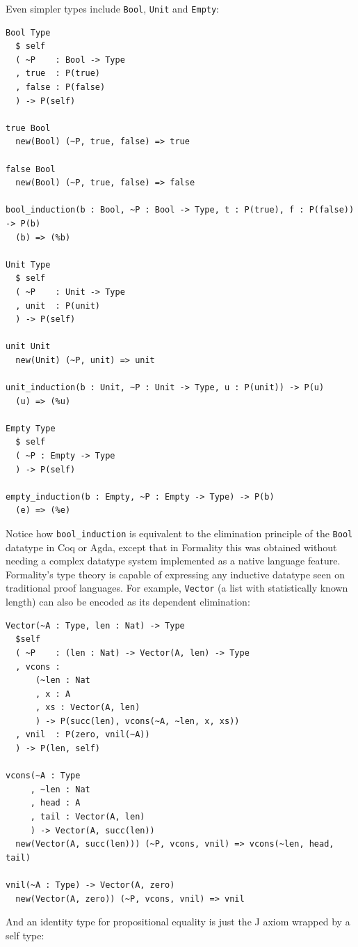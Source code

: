 \documentclass{article}
\theoremstyle{definition}
\theoremstyle{theorem}
\begin{document}
Even simpler types include \verb|Bool|, \verb|Unit| and \verb|Empty|:

\begin{lstlisting}
Bool Type
  $ self
  ( ~P    : Bool -> Type
  , true  : P(true)
  , false : P(false)
  ) -> P(self)

true Bool
  new(Bool) (~P, true, false) => true

false Bool
  new(Bool) (~P, true, false) => false

bool_induction(b : Bool, ~P : Bool -> Type, t : P(true), f : P(false)) -> P(b)
  (b) => (%b)

Unit Type
  $ self
  ( ~P    : Unit -> Type
  , unit  : P(unit)
  ) -> P(self)

unit Unit
  new(Unit) (~P, unit) => unit

unit_induction(b : Unit, ~P : Unit -> Type, u : P(unit)) -> P(u)
  (u) => (%u)

Empty Type
  $ self
  ( ~P : Empty -> Type
  ) -> P(self)

empty_induction(b : Empty, ~P : Empty -> Type) -> P(b)
  (e) => (%e)
\end{lstlisting}

Notice how \verb|bool_induction| is equivalent to the elimination
principle of the \verb|Bool| datatype in Coq or Agda, except that in Formality
this was obtained without needing a complex datatype system implemented as
a native language feature. Formality's type theory is capable of expressing any
inductive datatype seen on traditional proof languages. For example,
\verb|Vector| (a list with statistically known length) can also be encoded as
its dependent elimination:

\begin{lstlisting}
Vector(~A : Type, len : Nat) -> Type
  $self
  ( ~P    : (len : Nat) -> Vector(A, len) -> Type
  , vcons :
      (~len : Nat
      , x : A
      , xs : Vector(A, len)
      ) -> P(succ(len), vcons(~A, ~len, x, xs))
  , vnil  : P(zero, vnil(~A))
  ) -> P(len, self)

vcons(~A : Type
     , ~len : Nat
     , head : A
     , tail : Vector(A, len)
     ) -> Vector(A, succ(len))
  new(Vector(A, succ(len))) (~P, vcons, vnil) => vcons(~len, head, tail)

vnil(~A : Type) -> Vector(A, zero)
  new(Vector(A, zero)) (~P, vcons, vnil) => vnil
\end{lstlisting}

And an identity type for propositional equality is just the J axiom wrapped by a
self type:
\end{document}
